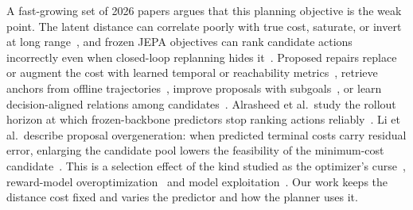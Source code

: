 A fast-growing set of 2026 papers argues that this planning objective is the weak point. The latent distance can correlate poorly with true cost, saturate, or invert at long range~\cite{singh2026objective}, and frozen JEPA objectives can rank candidate actions incorrectly even when closed-loop replanning hides it~\cite{zhang2026arcbench,wang2026decisionmetric,chen2026atm}. Proposed repairs replace or augment the cost with learned temporal or reachability metrics~\cite{li2026trm,bai2026tdjepa,fu2026cgs}, retrieve anchors from offline trajectories~\cite{liu2026anchored}, improve proposals with subgoals~\cite{cheng2026sage}, or learn decision-aligned relations among candidates~\cite{liu2026djepa}. Alrasheed et al.\ study the rollout horizon at which frozen-backbone predictors stop ranking actions reliably~\cite{alrasheed2026limits}. Li et al.\ describe proposal overgeneration: when predicted terminal costs carry residual error, enlarging the candidate pool lowers the feasibility of the minimum-cost candidate~\cite{li2026overgeneration}. This is a selection effect of the kind studied as the optimizer's curse~\cite{smith2006optimizers}, reward-model overoptimization~\cite{gao2023overopt,khalaf2025inferencehacking} and model exploitation~\cite{bhamidipaty2026exploitable}. Our work keeps the distance cost fixed and varies the predictor and how the planner uses it.

